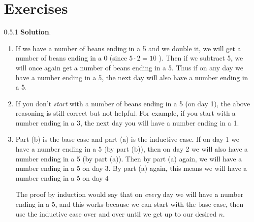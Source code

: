 \documentclass[11pt,]{book}
\theoremstyle{ptxplainnotitle}
\theoremstyle{ptxplaintitle}
\theoremstyle{ptxdefinitionnotitle}
\theoremstyle{ptxdefinitiontitle}
\theoremstyle{ptxdefinitionnotitle}
\theoremstyle{ptxdefinitiontitle}
\theoremstyle{ptxdefinitionnotitle}
\theoremstyle{ptxdefinitiontitle}
\theoremstyle{ptxdefinitiontitlenonumber}
\theoremstyle{ptxdefinitiontitlenonumber}
\numberwithin{equation}{chapter}
\begin{document}
\section*{Exercises}
\begin{divisionexercise}{0.5.1}
\textbf{Solution}.\quad%
\hypertarget{p-603}{}%
\leavevmode%
\begin{enumerate}[label=(\alph*)]
\item\hypertarget{li-254}{}\hypertarget{p-604}{}%
If we have a number of beans ending in a 5 and we double it, we will get a number of beans ending in a 0 (since \(5\cdot 2 = 10\) ).  Then if we subtract 5, we will once again get a number of beans ending in a 5.  Thus if on any day we have a number ending in a 5, the next day will also have a number ending in a 5.%
\item\hypertarget{li-255}{}\hypertarget{p-605}{}%
If you don't \emph{start} with a number of beans ending in a 5 (on day 1), the above reasoning is still correct but not helpful.  For example, if you start with a number ending in a 3, the next day you will have a number ending in a 1.%
\item\hypertarget{li-256}{}\hypertarget{p-606}{}%
Part (b) is the base case and part (a) is the inductive case.  If on day 1 we have a number ending in a 5 (by part (b)), then on day 2 we will also have a number ending in a 5 (by part (a)).  Then by part (a) again, we will have a number ending in a 5 on day 3.  By part (a) again, this means we will have a number ending in a 5 on day 4%
\par
\hypertarget{p-607}{}%
The proof by induction would say that on \emph{every} day we will have a number ending in a 5, and this works because we can start with the base case, then use the inductive case over and over until we get up to our desired \(n\).%
\end{enumerate}
%
\end{divisionexercise}%
\end{document}

